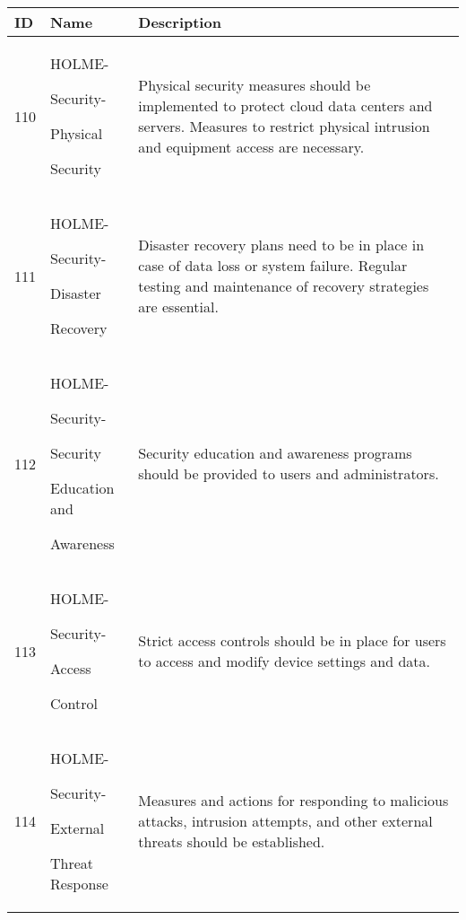 \documentclass[conference]{IEEEtran}
\begin{document}
\begin{enumerate}
\begin{table}[h]
\def\arraystretch{1.2} \small
    \begin{tabular}{|p{1cm}|p{1.8cm}|p{5.0cm}|}
        \hline
        ID & Name & Description\\ \hline
        110 \par  & HOLME-\par Security-\par Physical \par Security  &Physical security measures should be implemented to protect cloud data centers and servers. Measures to restrict physical intrusion and equipment access are necessary. \\ \hline
        111 \par  & HOLME-\par Security-\par Disaster \par Recovery & Disaster recovery plans need to be in place in case of data loss or system failure. Regular testing and maintenance of recovery strategies are essential. \\ \hline
        112 \par  & HOLME-\par Security-\par Security \par Education and \par Awareness & Security education and awareness programs should be provided to users and administrators. \\ \hline
        113 \par  & HOLME-\par Security-\par Access \par Control & Strict access controls should be in place for users to access and modify device settings and data. \\ \hline
         114 \par  & HOLME-\par Security-\par External \par Threat Response & Measures and actions for responding to malicious attacks, intrusion attempts, and other external threats should be established. \\ \hline
    \end{tabular}
\end{table}


\end{enumerate}
\end{document}
